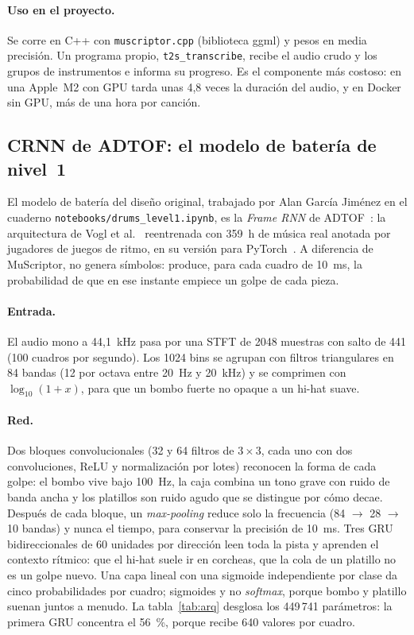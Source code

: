 \documentclass[11pt,a4paper]{article}
\begin{document}
\paragraph{Uso en el proyecto.} Se corre en C++ con \texttt{muscriptor.cpp} (biblioteca ggml) y pesos en
media precisión. Un programa propio, \texttt{t2s\_transcribe}, recibe el audio crudo y los grupos de
instrumentos e informa su progreso. Es el componente más costoso: en una Apple~M2 con GPU tarda unas 4{,}8
veces la duración del audio, y en Docker sin GPU, más de una hora por canción.

\subsection{CRNN de ADTOF: el modelo de batería de nivel~1}
\label{sec:adtof}
El modelo de batería del diseño original, trabajado por Alan García Jiménez en el cuaderno
\texttt{notebooks/drums\_level1.ipynb}, es la \emph{Frame RNN} de ADTOF~\cite{zehren2023adtof}: la
arquitectura de Vogl et al.~\cite{vogl2017} reentrenada con 359~h de música real anotada por jugadores de
juegos de ritmo, en su versión para PyTorch~\cite{riley_adtofpytorch}. A diferencia de MuScriptor, no
genera símbolos: produce, para cada cuadro de 10~ms, la probabilidad de que en ese instante empiece un
golpe de cada pieza.

\paragraph{Entrada.} El audio mono a 44{,}1~kHz pasa por una STFT de 2048 muestras con salto de 441 (100
cuadros por segundo). Los 1024 bins se agrupan con filtros triangulares en 84 bandas (12 por octava
entre 20~Hz y 20~kHz) y se comprimen con $\log_{10}(1+x)$, para que un bombo fuerte no opaque a un
hi-hat suave.

\paragraph{Red.} Dos bloques convolucionales (32 y 64 filtros de $3\times3$, cada uno con dos
convoluciones, ReLU y normalización por lotes) reconocen la forma de cada golpe: el bombo vive bajo
100~Hz, la caja combina un tono grave con ruido de banda ancha y los platillos son ruido agudo que se
distingue por cómo decae. Después de cada bloque, un \emph{max-pooling} reduce solo la frecuencia (84
$\to$ 28 $\to$ 10 bandas) y nunca el tiempo, para conservar la precisión de 10~ms. Tres GRU
bidireccionales de 60 unidades por dirección leen toda la pista y aprenden el contexto rítmico: que el
hi-hat suele ir en corcheas, que la cola de un platillo no es un golpe nuevo. Una capa lineal con una
sigmoide independiente por clase da cinco probabilidades por cuadro; sigmoides y no \emph{softmax},
porque bombo y platillo suenan juntos a menudo. La tabla~\ref{tab:arq} desglosa los 449\,741
parámetros: la primera GRU concentra el 56~\%, porque recibe 640 valores por cuadro.
\end{document}
